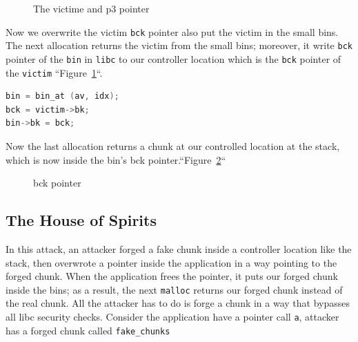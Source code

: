 \documentclass{masterthesis}
\newcommand*\sbs{small bins}
\newcommand*\mallocc{\lstinline{malloc}}
\begin{document}
\begin{figure}[h!]
\caption{The victime and p3 pointer}
\label{fig:gdb4}
\end{figure}

Now we overwrite the victim \lstinline{bck} pointer also put the victim in the \sbs{}. The next allocation returns the victim from the \sbs{}; moreover, it write \lstinline{bck} pointer of the \lstinline{bin} in \lstinline{libc} to our controller location which is the \lstinline{bck} pointer of the \lstinline{victim} ``Figure~\ref{fig:gdb4}``.

\begin{lstlisting}[language=c,frame=tlrb]
bin = bin_at (av, idx);
bck = victim->bk;
bin->bk = bck;
\end{lstlisting}

Now the last allocation returns a chunk at our controlled location at the stack, which is now inside the bin's bck pointer.``Figure~\ref{fig:gdb5}``

\begin{figure}[h!]
\caption{bck pointer}
\label{fig:gdb5}
\end{figure}

\subsection{The House of Spirits}
In this attack, an attacker forged a fake chunk inside a controller location like the stack, then overwrote a pointer inside the application in a way pointing to the forged chunk. When the application frees the pointer, it puts our forged chunk inside the bins; as a result, the next \mallocc{} returns our forged chunk instead of the real chunk. All the attacker has to do is forge a chunk in a way that bypasses all libc security checks. Consider the application have a pointer call \lstinline{a}, attacker has a forged chunk called \lstinline{fake_chunks}
\end{document}

